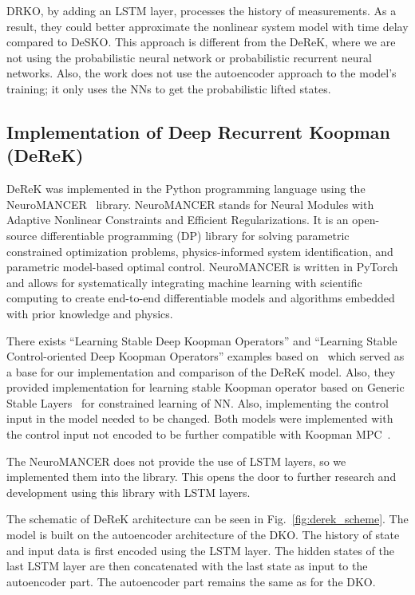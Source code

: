 \documentclass[conference]{IEEEtran}
\begin{document}
DRKO, by adding an LSTM layer, processes the history of measurements. As a result, they could better approximate the nonlinear system model with time delay compared to DeSKO. This approach is different from the DeReK, where we are not using the probabilistic neural network or probabilistic recurrent neural networks. Also, the work does not use the autoencoder approach to the model's training; it only uses the NNs to get the probabilistic lifted states.

\subsection{Implementation of Deep Recurrent Koopman (DeReK)}
DeReK was implemented in the Python programming language using the NeuroMANCER~\cite{Neuromancer2023} library. NeuroMANCER stands for Neural Modules with Adaptive Nonlinear Constraints and Efficient Regularizations. It is an open-source differentiable programming (DP) library for solving parametric constrained optimization problems, physics-informed system identification, and parametric model-based optimal control. NeuroMANCER is written in PyTorch and allows for systematically integrating machine learning with scientific computing to create end-to-end differentiable models and algorithms embedded with prior knowledge and physics.

There exists ``Learning Stable Deep Koopman Operators'' and ``Learning Stable Control-oriented Deep Koopman Operators'' examples based on~\cite{shi2022deep, korda2020optimal,lusch2018deep} which served as a base for our implementation and comparison of the DeReK model. Also, they provided implementation for learning stable Koopman operator based on Generic Stable Layers~\cite{skomski2021constrained, drgovna2022dissipative, zhang2018stabilizing} for constrained learning of NN. Also, implementing the control input in the model needed to be changed. Both models were implemented with the control input not encoded to be further compatible with Koopman MPC~\cite{korda2018linear}.

The NeuroMANCER does not provide the use of LSTM layers, so we implemented them into the library. This opens the door to further research and development using this library with LSTM layers.

The schematic of DeReK architecture can be seen in Fig.~\ref{fig:derek_scheme}. The model is built on the autoencoder architecture of the DKO. The history of state and input data is first encoded using the LSTM layer. The hidden states of the last LSTM layer are then concatenated with the last state as input to the autoencoder part. The autoencoder part remains the same as for the DKO.
\end{document}
